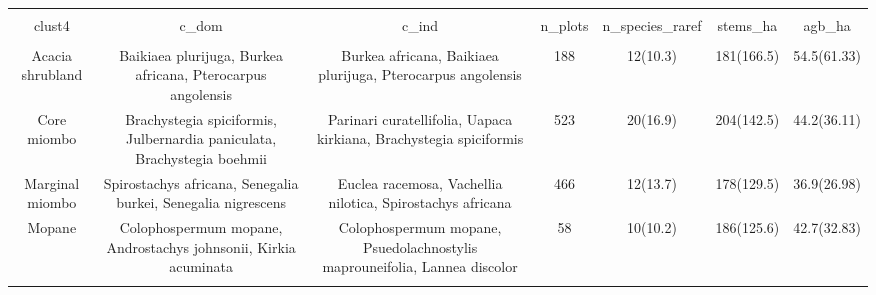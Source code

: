 
\begin{table}[!htbp] \centering 
  \caption{} 
  \label{clust_summ} 
\begin{tabular}{@{\extracolsep{5pt}} ccccccc} 
\\[-1.8ex]\hline 
\hline \\[-1.8ex] 
clust4 & c\_dom & c\_ind & n\_plots & n\_species\_raref & stems\_ha & agb\_ha \\ 
\hline \\[-1.8ex] 
Acacia shrubland & Baikiaea plurijuga, Burkea africana, Pterocarpus angolensis & Burkea africana, Baikiaea plurijuga, Pterocarpus angolensis & 188 & 12(10.3) & 181(166.5) & 54.5(61.33) \\ 
Core miombo & Brachystegia spiciformis, Julbernardia paniculata, Brachystegia boehmii & Parinari curatellifolia, Uapaca kirkiana, Brachystegia spiciformis & 523 & 20(16.9) & 204(142.5) & 44.2(36.11) \\ 
Marginal miombo & Spirostachys africana, Senegalia burkei, Senegalia nigrescens & Euclea racemosa, Vachellia nilotica, Spirostachys africana & 466 & 12(13.7) & 178(129.5) & 36.9(26.98) \\ 
Mopane & Colophospermum mopane, Androstachys johnsonii, Kirkia acuminata & Colophospermum mopane, Psuedolachnostylis maprouneifolia, Lannea discolor & 58 & 10(10.2) & 186(125.6) & 42.7(32.83) \\ 
\hline \\[-1.8ex] 
\end{tabular} 
\end{table} 

